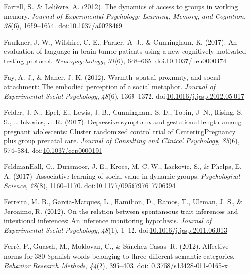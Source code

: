\documentclass[english,man]{apa6}
\begin{document}
\hypertarget{ref-Farrell2012}{}
Farrell, S., \& Lelièvre, A. (2012). The dynamics of access to groups in
working memory. \emph{Journal of Experimental Psychology: Learning,
Memory, and Cognition}, \emph{38}(6), 1659--1674.
doi:\href{https://doi.org/10.1037/a0028469}{10.1037/a0028469}

\hypertarget{ref-Faulkner2017}{}
Faulkner, J. W., Wilshire, C. E., Parker, A. J., \& Cunningham, K.
(2017). An evaluation of language in brain tumor patients using a new
cognitively motivated testing protocol. \emph{Neuropsychology},
\emph{31}(6), 648--665.
doi:\href{https://doi.org/10.1037/neu0000374}{10.1037/neu0000374}

\hypertarget{ref-Fay2012}{}
Fay, A. J., \& Maner, J. K. (2012). Warmth, spatial proximity, and
social attachment: The embodied perception of a social metaphor.
\emph{Journal of Experimental Social Psychology}, \emph{48}(6),
1369--1372.
doi:\href{https://doi.org/10.1016/j.jesp.2012.05.017}{10.1016/j.jesp.2012.05.017}

\hypertarget{ref-Felder2017a}{}
Felder, J. N., Epel, E., Lewis, J. B., Cunningham, S. D., Tobin, J. N.,
Rising, S. S., \ldots{} Ickovics, J. R. (2017). Depressive symptoms and
gestational length among pregnant adolescents: Cluster randomized
control trial of CenteringPregnancy plus group prenatal care.
\emph{Journal of Consulting and Clinical Psychology}, \emph{85}(6),
574--584.
doi:\href{https://doi.org/10.1037/ccp0000191}{10.1037/ccp0000191}

\hypertarget{ref-FeldmanHall2017}{}
FeldmanHall, O., Dunsmoor, J. E., Kroes, M. C. W., Lackovic, S., \&
Phelps, E. A. (2017). Associative learning of social value in dynamic
groups. \emph{Psychological Science}, \emph{28}(8), 1160--1170.
doi:\href{https://doi.org/10.1177/0956797617706394}{10.1177/0956797617706394}

\hypertarget{ref-Ferreira2012}{}
Ferreira, M. B., Garcia-Marques, L., Hamilton, D., Ramos, T., Uleman, J.
S., \& Jeronimo, R. (2012). On the relation between spontaneous trait
inferences and intentional inferences: An inference monitoring
hypothesis. \emph{Journal of Experimental Social Psychology},
\emph{48}(1), 1--12.
doi:\href{https://doi.org/10.1016/j.jesp.2011.06.013}{10.1016/j.jesp.2011.06.013}

\hypertarget{ref-Ferre2012}{}
Ferré, P., Guasch, M., Moldovan, C., \& Sánchez-Casas, R. (2012).
Affective norms for 380 Spanish words belonging to three different
semantic categories. \emph{Behavior Research Methods}, \emph{44}(2),
395--403.
doi:\href{https://doi.org/10.3758/s13428-011-0165-x}{10.3758/s13428-011-0165-x}
\end{document}
